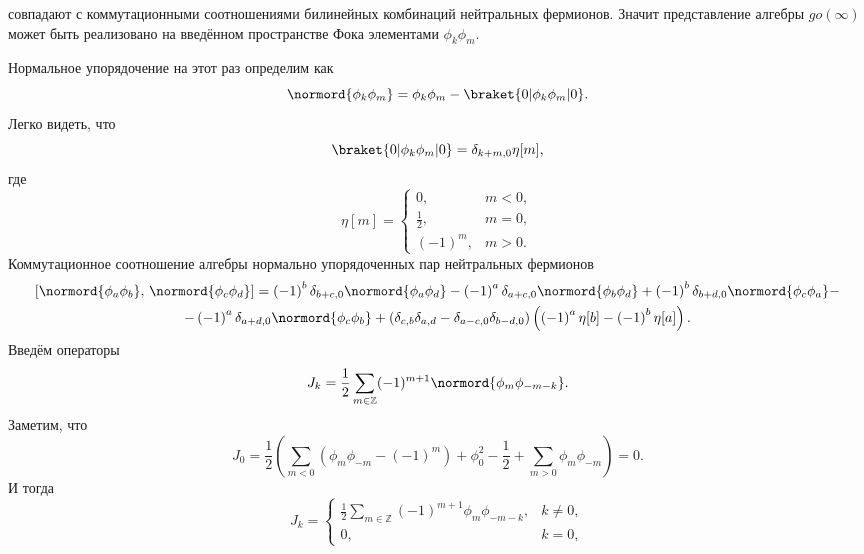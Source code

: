 \documentclass[a4paper,14pt]{extarticle}
\numberwithin{equation}{section}
\begin{document}
совпадают с коммутационными соотношениями билинейных
комбинаций нейтральных фермионов. Значит представление
алгебры $go(\infty)$ может быть реализовано
на введённом пространстве Фока элементами $\phi_k \phi_m$.

Нормальное упорядочение на этот раз определим как
\begin{equation}
\normord{\phi_k \phi_m}= \phi_k \phi_m - \braket{0 | \phi_k
\phi_m| 0}
.\end{equation} 
Легко видеть, что 
\begin{equation}
	\braket{0 | \phi_k \phi_m | 0}=\delta_{k+m,0} \eta[m]
,\end{equation}
где
\begin{equation}
	\eta[m]= \begin{cases}
		0,& m<0,\\
		\frac{1}{2},& m=0,\\
		(-1)^m,& m>0.
	\end{cases}
\end{equation} 
Коммутационное соотношение алгебры нормально упорядоченных пар нейтральных
фермионов 
\begin{multline}
	\left[ \normord{\phi_a \phi_b},\,\normord{\phi_c \phi_d} \right] =\left( -1 \right) ^b \delta_{b+c,0}
	\normord{\phi_a \phi_d}-\left( -1 \right) ^a
	\delta_{a+c,0}
	\normord{\phi_b \phi_d}+\left( -1 \right) ^b
	\delta_{b+d,0}\normord{\phi_c \phi_a}-\\-
	\left( -1 \right) ^a \delta_{a+d,0}
	\normord{\phi_c \phi_b}+
	\left(\delta_{c,b}\delta_{a,d}-\delta_{a-c,0}
	\delta_{b-d,0}\right) \left( 
\left( -1 \right) ^a \eta[b]-\left( -1 \right) ^b \eta[a]\right) 
.\end{multline} 
Введём операторы
\begin{equation}
	J_k= \frac{1}{2} \sum_{m \in \mathbb{Z}}^{} (-1)^{m+1} \normord{\phi_m \phi_{-m-k}}
.\end{equation} 
Заметим, что
\begin{equation}
J_0=\frac{1}{2}\left(\sum_{m<0}^{} \left( \phi_m \phi_{-m}-(-1)^m \right)+\phi_0^2-\frac{1}{2}+\sum_{m>0}^{} \phi_m \phi_{-m} \right)=0
.\end{equation} 
И тогда
\begin{equation}
J_k = \begin{cases}
	\displaystyle \frac{1}{2} \sum_{m \in \mathbb{Z}}^{} (-1)^{m+1}
	\phi_m \phi_{-m-k},& k\neq 0,\\
	0,& k=0,
\end{cases}
\end{equation} 
\end{document}
